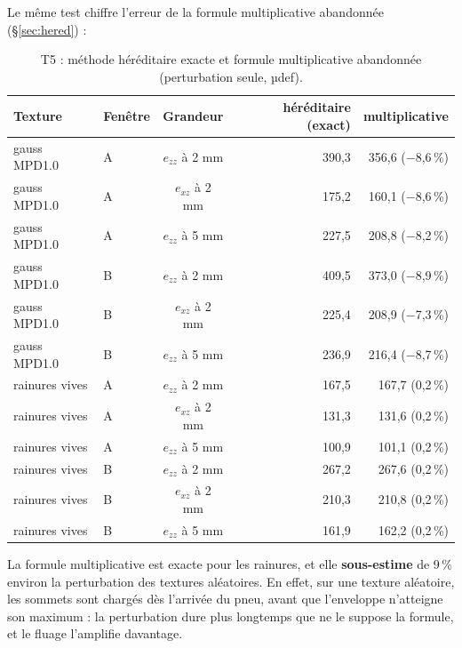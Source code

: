 Le même test chiffre l'erreur de la formule multiplicative abandonnée (\S\ref{sec:hered}) :
\begin{table}[H]\centering\small
\caption{T5 : méthode héréditaire exacte et formule multiplicative abandonnée (perturbation seule, µdef).}\label{tab:t5}
\begin{tabular}{llcrr}
\toprule
Texture & Fenêtre & Grandeur & héréditaire (exact) & multiplicative\\
\midrule
gauss MPD1.0 & A & $e_{zz}$ à 2 mm & 390,3 & 356,6 ($-$8,6\,\%)\\
gauss MPD1.0 & A & $e_{xz}$ à 2 mm & 175,2 & 160,1 ($-$8,6\,\%)\\
gauss MPD1.0 & A & $e_{zz}$ à 5 mm & 227,5 & 208,8 ($-$8,2\,\%)\\
gauss MPD1.0 & B & $e_{zz}$ à 2 mm & 409,5 & 373,0 ($-$8,9\,\%)\\
gauss MPD1.0 & B & $e_{xz}$ à 2 mm & 225,4 & 208,9 ($-$7,3\,\%)\\
gauss MPD1.0 & B & $e_{zz}$ à 5 mm & 236,9 & 216,4 ($-$8,7\,\%)\\
rainures vives & A & $e_{zz}$ à 2 mm & 167,5 & 167,7 (0,2\,\%)\\
rainures vives & A & $e_{xz}$ à 2 mm & 131,3 & 131,6 (0,2\,\%)\\
rainures vives & A & $e_{zz}$ à 5 mm & 100,9 & 101,1 (0,2\,\%)\\
rainures vives & B & $e_{zz}$ à 2 mm & 267,2 & 267,6 (0,2\,\%)\\
rainures vives & B & $e_{xz}$ à 2 mm & 210,3 & 210,8 (0,2\,\%)\\
rainures vives & B & $e_{zz}$ à 5 mm & 161,9 & 162,2 (0,2\,\%)\\
\bottomrule
\end{tabular}
\end{table}
La formule multiplicative est exacte pour les rainures, et elle \textbf{sous-estime} de 9\,\% environ la perturbation des textures aléatoires. En
effet, sur une texture aléatoire, les sommets sont chargés dès l'arrivée du pneu, avant que
l'enveloppe n'atteigne son maximum : la perturbation dure plus longtemps que ne le suppose la
formule, et le fluage l'amplifie davantage.


